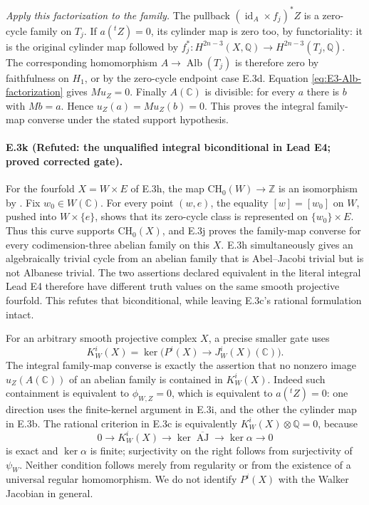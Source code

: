 \emph{Apply this factorization to the family.}
The pullback $(\operatorname{id}_A\times f_j)^*Z$ is a
zero-cycle family on $T_j$. If $a({}^tZ)=0$, its cylinder map
is zero too, by functoriality: it is the original cylinder
map followed by
$f_j^*:H^{2n-3}(X,\mathbb Q)\to H^{2n-3}(T_j,\mathbb Q)$.
The corresponding homomorphism
$A\to\operatorname{Alb}(T_j)$ is therefore zero by faithfulness
on $H_1$, or by the zero-cycle endpoint case E.3d.
Equation \eqref{eq:E3-Alb-factorization} gives $M u_Z=0$.
Finally $A(\mathbb C)$ is divisible: for every $a$ there is
$b$ with $Mb=a$. Hence $u_Z(a)=M u_Z(b)=0$. This proves
the integral family-map converse under the stated support
hypothesis.

\paragraph{E.3k (Refuted: the unqualified integral biconditional in Lead E4;
proved corrected gate).}
For the fourfold $X=W\times E$ of E.3h, the map
$\mathrm{CH}_0(W)\to\mathbb Z$ is an isomorphism by
\citet[Lemma 2.4, author p.~4]{cyOttemSuzuki2020}.
Fix $w_0\in W(\mathbb C)$. For every point $(w,e)$,
the equality $[w]=[w_0]$ on $W$, pushed into $W\times\{e\}$,
shows that its zero-cycle class is represented on
$\{w_0\}\times E$. Thus this curve supports
$\mathrm{CH}_0(X)$, and E.3j proves the family-map converse
for every codimension-three abelian family on this $X$.
E.3h simultaneously gives an algebraically trivial cycle from
an abelian family that is Abel--Jacobi trivial but is not
Albanese trivial. The two assertions declared equivalent in
the literal integral Lead E4 therefore have different truth
values on the same smooth projective fourfold. This refutes
that biconditional, while leaving E.3c's rational formulation
intact.

For an arbitrary smooth projective complex $X$, a precise
smaller gate uses
\[
 K_W^i(X)=\ker\bigl(P^i(X)\longrightarrow J_W^i(X)(\mathbb C)\bigr).
\]
The integral family-map converse is exactly the assertion
that no nonzero image $u_Z(A(\mathbb C))$ of an abelian family
is contained in $K_W^i(X)$. Indeed such containment is
equivalent to $\phi_{W,Z}=0$, which is equivalent to
$a({}^tZ)=0$: one direction uses the finite-kernel argument
in E.3i, and the other the cylinder map in E.3b.
The rational criterion in E.3c is equivalently
$K_W^i(X)\otimes\mathbb Q=0$, because
\[
 0\longrightarrow K_W^i(X)\longrightarrow
 \ker\overline{\operatorname{AJ}}
 \longrightarrow\ker\alpha\longrightarrow0
\]
is exact and $\ker\alpha$ is finite; surjectivity on the right
follows from surjectivity of $\psi_W$.
Neither condition follows merely from regularity or from the
existence of a universal regular homomorphism. We do not
identify $P^i(X)$ with the Walker Jacobian in general.

